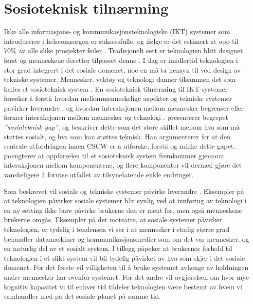 \section{Sosioteknisk tilnærming}
\label{section:sosioteknisk}

Ikke alle informasjons- og kommunikasjonsteknologiske (IKT) systemer som introduseres i helseomsorgen er suksessfulle, og ifølge \citet{FITT} er det estimert at opp til 70\% av alle slike prosjekter feiler \citep{Coiera07}. Tradisjonelt sett er teknologien blitt designet først og menneskene deretter tilpasset denne \citep{Appelbaum97}.
I dag er imidlertid teknologien i stor grad integrert i det sosiale domenet, noe en må ta hensyn til ved design av tekniske systemer. Mennesker, vektøy og teknologi danner tilsammen det som kalles et sosioteknisk system \citep{Coiera04}.
En sosioteknisk tilnærming til IKT-systemer forsøker å forstå hvordan mellommenneskelige aspekter og tekniske systemer påvirker hverandre \citep{Coiera04}, og hvordan interaksjonen mellom mennesker begrenser eller former interaksjonen mellom mennesker og teknologi \citep{Coiera07}. \citet{Ackerman00} presenterer begrepet \textit{”sosioteknisk gap”}, og beskriver dette som det store skillet mellom hva som må støttes sosialt, og hva som kan støttes teknisk. Han argumenterer for at den sentrale utfordringen innen CSCW er å utforske, forstå og minke dette gapet. \citet{Coiera04} poengterer at oppførselen til et sosioteknisk system fremkommer gjennom interaksjonen mellom komponentene, og flere komponenter vil dermed gjøre det vanskeligere å forutse utfallet av tilsynelatende enkle endringer.

\noindent
Som beskrevet vil sosiale og tekniske systemer påvirke hverandre \citep{Coiera04}. Eksempler på at teknologien påvirker sosiale systemer blir synlig ved at innføring av teknologi i en ny setting ikke bare påvirke brukerne den er ment for, men også menneskene brukerne omgås. Eksempler på det motsatte, at sosiale systemer påvirker teknologien, er tydelig i tendensen vi ser i at mennesker i stadig større grad behandler datamaskiner og kommunikasjonsmedier som om det var mennesker, og en naturlig del av et sosialt system. I tillegg påpeker \citet{Coiera07} at brukernes forhold til teknologien i et slikt system vil bli tydelig påvirket av hva som skjer i det sosiale domenet. For det første vil villigheten til å bruke systemet avhenge av holdningen andre mennesker har ovenfor systemet. For det andre vil avgjørelsen om hvor mye kognitiv kapasitet vi til enhver tid tildeler teknologien være bestemt av hvem vi samhandler med på det sosiale planet på samme tid.

